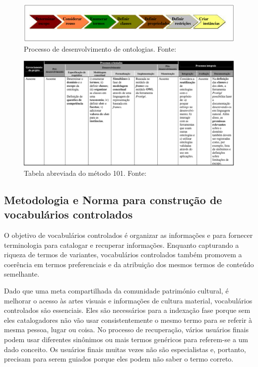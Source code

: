 \pagebreak

\begin{figure}[h] 
\centering 
\includegraphics[scale=0.6]{Figuras/11.png} 
\caption[Processo de desenvolvimento de ontologias.]{Processo de desenvolvimento de ontologias. Fonte: \cite{DanielaLucas2008}}
\label{fig:processo_101}
\end{figure}

\begin{figure}[h] 
\centering 
\includegraphics[scale=0.4]{Figuras/12.png} 
\caption[Tabela abreviada do método 101]{Tabela abreviada do método 101. Fonte: \cite{DanielaLucas2008}}
\end{figure}

\subsection{Metodologia e Norma para construção de vocabulários controlados} 
 O objetivo de vocabulários controlados é organizar as informações e
para fornecer terminologia para catalogar e recuperar informações. Enquanto
capturando a riqueza de termos de variantes, vocabulários controlados também
promovem a coerência em termos preferenciais e da atribuição dos mesmos termos de conteúdo semelhante.
	
Dado que uma meta compartilhada da comunidade património cultural,
é melhorar o acesso às artes visuais e informações de cultura material,
vocabulários controlados são essenciais. Eles são necessários para a indexação
fase porque sem eles catalogadores não vão usar consistentemente o mesmo
termo para se referir à mesma pessoa, lugar ou coisa. No processo de recuperação,
vários usuários finais podem usar diferentes sinônimos ou mais termos genéricos para
referem-se a um dado conceito. Os usuários finais muitas vezes não são especialistas e, portanto, precisam para
serem guiados porque eles podem não saber o termo correto.

